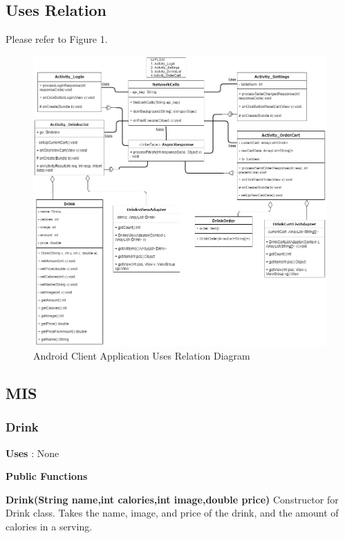 \documentclass [10pt]{article}
\begin{document}
\subsection{Uses Relation}

Please refer to Figure 1.

\begin{figure} [h!]
	\centering
	\includegraphics [scale = 0.4] {figures/Client_UsesDiagram.png}
	\caption{Android Client Application Uses Relation Diagram}
\end{figure}



\subsection{MIS}

\subsubsection{Drink}

\textbf{Uses} : None

\textbf{Public Functions}

\textbf{Drink(String name,int calories,int image,double price)}
Constructor for Drink class. Takes the name, image, and price of the drink, and the amount of calories in a serving.
\end{document}
